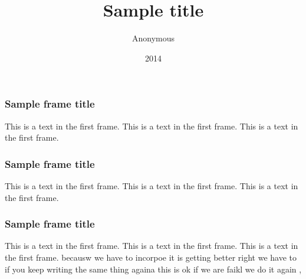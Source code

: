 \documentclass{beamer}
\title{Sample title}
\author{Anonymous}
\date{2014}
\begin{document}
\frame{\titlepage}

\begin{frame}
\frametitle{Sample frame title}
This is a text in the first frame. This is a text in the first frame. This is a text in the first frame.
\end{frame}

\begin{frame}
\frametitle{Sample frame title}
This is a text in the first frame. This is a text in the first frame. This is a text in the first frame.
\end{frame}

\begin{frame}
\frametitle{Sample frame title}
This is a text in the first frame. This is a text in the first frame. This is a text in the first frame. becausw we have to incorpoe	it is getting better right we have to if you keep writing the same thing againa this is ok if we are faikl we do it again ,
\end{frame}
\end{document}
